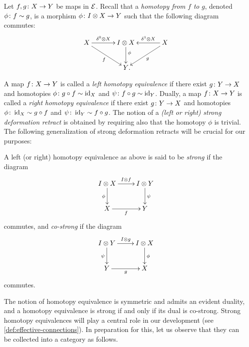\documentclass[reqno,10pt,a4paper,oneside,draft]{amsart}
\begin{document}
Let $f, g \colon X \to Y$ be maps in $\mathcal{E}$.
Recall that a \emph{homotopy from $f$ to $g$}, denoted $\phi \colon f \sim g$, is a morphism $\phi \colon I \otimes X \to Y$ such that the following diagram commutes:
\begin{equation}
\label{equ:homotopy}
\begin{gathered}
\xymatrix@C=1.2cm{
  X
  \ar[r]^-{\lcyl \otimes X}
  \ar[dr]_{f}
&
  \interval \otimes X
  \ar[d]^(0.4){\phi}
&
  X
  \ar[dl]^{g}
  \ar[l]_-{\rcyl \otimes X}
\\&
  Y
\rlap{.}}
\end{gathered}
\end{equation}

A map $f \colon X \to Y$ is called a \emph{left homotopy equivalence} if there exist $g \colon Y \to X$ and homotopies $\phi \colon g \mathbin{\circ} f \sim \operatorname{id}_X $ and $\psi \colon f \mathbin{\circ} g \sim \operatorname{id}_Y$.
Dually, a map $f \colon X \to Y$ is called a \emph{right homotopy equivalence} if there exist $g \colon Y \to X$ and homotopies $\phi \colon \operatorname{id}_X \sim g \mathbin{\circ} f$ and $\psi \colon \operatorname{id}_Y \sim f \mathbin{\circ} g$.
The notion of a \emph{(left or right) strong deformation retract} is obtained by requiring also that the homotopy $\phi$ is trivial.
The following generalization of strong deformation retracts will be crucial for our purposes:

\begin{definition} \label{def:strhe}
A left (or right) homotopy equivalence as above is said to be \emph{strong} if the diagram
\[
\xymatrix{
  \interval \otimes X \ar[r]^{\interval \otimes f} \ar[d]_{\phi} & \interval \otimes Y \ar[d]^{\psi} \\
  X \ar[r]_{f} & Y
}
\]
commutes, and \emph{co-strong} if the diagram
\[
  \xymatrix{
  \interval \otimes Y \ar[r]^{\interval \otimes g} \ar[d]_{\psi} & \interval \otimes X \ar[d]^{\phi} \\
  Y \ar[r]_{g} & X
}
\]
commutes.
\end{definition}

The notion of homotopy equivalence is symmetric and admits an evident duality, and a homotopy equivalence is strong if and only if its dual is co-strong.
Strong homotopy equivalences will play a central role in our development (see \cref{def:effective-connections}).
In preparation for this, let us observe that they can be collected into a category as follows.
\end{document}
